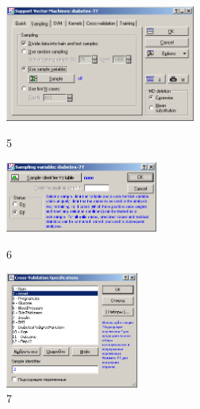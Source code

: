 \begin{figure}[!h]
  \centering

  \begin{minipage}{0.32\textwidth}
    \centering

    \includegraphics[height=3.8cm]
    {inc/v5_5.PNG}

    \caption{5}

    \label{fig:v5_5}
  \end{minipage}
  \begin{minipage}{0.42\textwidth}
    \centering

    \includegraphics[width=5cm]
    {inc/v5_6.PNG}

    \caption{6}

    \label{fig:v5_6}
  \end{minipage}
  \begin{minipage}{0.22\textwidth}
    \centering

    \includegraphics[height=3.8cm]
    {inc/v5_7.PNG}

    \caption{7}

    \label{fig:v5_7}
  \end{minipage}
\end{figure}

